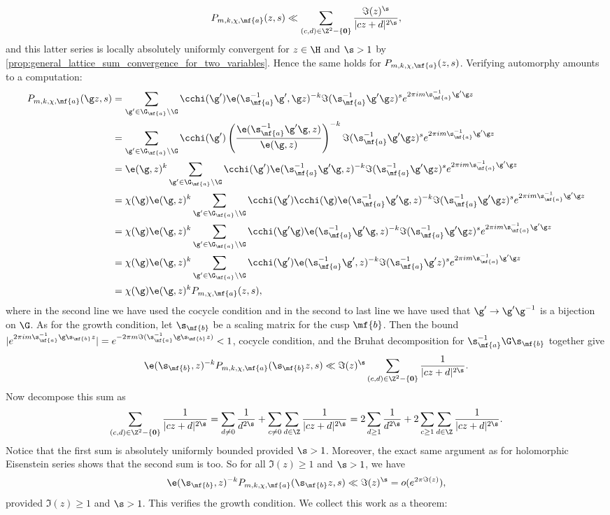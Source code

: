    \[
      P_{m,k,\chi,\mf{a}}(z,s) \ll \sum_{(c,d) \in \Z^{2}-\{\mathbf{0}\}}\frac{\Im(z)^{\s}}{|cz+d|^{2\s}},
    \]
    and this latter series is locally absolutely uniformly convergent for $z \in \H$ and $\s > 1$ by \cref{prop:general_lattice_sum_convergence_for_two_variables}. Hence the same holds for $P_{m,k,\chi,\mf{a}}(z,s)$. Verifying automorphy amounts to a computation:
    \begin{align*}
      P_{m,k,\chi,\mf{a}}(\g z,s) &= \sum_{\g' \in \G_{\mf{a}}\backslash\G}\cchi(\g')\e(\s_{\mf{a}}^{-1}\g',\g z)^{-k}\Im(\s_{\mf{a}}^{-1}\g'\g z)^{s}e^{2\pi im\s_{\mf{a}}^{-1}\g'\g z} \\
      &= \sum_{\g' \in \G_{\mf{a}}\backslash\G}\cchi(\g')\left(\frac{\e(\s_{\mf{a}}^{-1}\g'\g,z)}{\e(\g,z)}\right)^{-k}\Im(\s_{\mf{a}}^{-1}\g'\g z)^{s}e^{2\pi im\s_{\mf{a}}^{-1}\g'\g z} \\
      &= \e(\g,z)^{k}\sum_{\g' \in \G_{\mf{a}}\backslash\G}\cchi(\g')\e(\s_{\mf{a}}^{-1}\g'\g,z)^{-k}\Im(\s_{\mf{a}}^{-1}\g'\g z)^{s}e^{2\pi im\s_{\mf{a}}^{-1}\g'\g z} \\
      &= \chi(\g)\e(\g,z)^{k}\sum_{\g' \in \G_{\mf{a}}\backslash\G}\cchi(\g')\cchi(\g)\e(\s_{\mf{a}}^{-1}\g'\g,z)^{-k}\Im(\s_{\mf{a}}^{-1}\g'\g z)^{s}e^{2\pi im\s_{\mf{a}}^{-1}\g'\g z} \\
      &= \chi(\g)\e(\g,z)^{k}\sum_{\g' \in \G_{\mf{a}}\backslash\G}\cchi(\g'\g)\e(\s_{\mf{a}}^{-1}\g'\g,z)^{-k}\Im(\s_{\mf{a}}^{-1}\g'\g z)^{s}e^{2\pi im\s_{\mf{a}}^{-1}\g'\g z} \\
      &= \chi(\g)\e(\g,z)^{k}\sum_{\g' \in \G_{\mf{a}}\backslash\G}\cchi(\g')\e(\s_{\mf{a}}^{-1}\g',z)^{-k}\Im(\s_{\mf{a}}^{-1}\g' z)^{s}e^{2\pi im\s_{\mf{a}}^{-1}\g'\g z} \\
      &= \chi(\g)\e(\g,z)^{k}P_{m,\chi,\mf{a}}(z,s),
    \end{align*}
    where in the second line we have used the cocycle condition and in the second to last line we have used that $\g' \to \g'\g^{-1}$ is a bijection on $\G$. As for the growth condition, let $\s_{\mf{b}}$ be a scaling matrix for the cusp $\mf{b}$. Then the bound $|e^{2\pi im\s_{\mf{a}}^{-1}\g\s_{\mf{b}}z}| = e^{-2\pi m\Im(\s_{\mf{a}}^{-1}\g\s_{\mf{b}}z)} < 1$, cocycle condition, and the Bruhat decomposition for $\s_{\mf{a}}^{-1}\G\s_{\mf{b}}$ together give
    \[
      \e(\s_{\mf{b}},z)^{-k}P_{m,k,\chi,\mf{a}}(\s_{\mf{b}}z,s) \ll \Im(z)^{\s}\sum_{(c,d) \in \Z^{2}-\{\mathbf{0}\}}\frac{1}{|cz+d|^{2\s}}.
    \]
    Now decompose this sum as
    \[
      \sum_{(c,d) \in \Z^{2}-\{\mathbf{0}\}}\frac{1}{|cz+d|^{2\s}} = \sum_{d \neq 0}\frac{1}{d^{2\s}}+\sum_{c \neq 0}\sum_{d \in \Z}\frac{1}{|cz+d|^{2\s}} = 2\sum_{d \ge 1}\frac{1}{d^{2\s}}+2\sum_{c \ge 1}\sum_{d \in \Z}\frac{1}{|cz+d|^{2\s}}.
    \]
    Notice that the first sum is absolutely uniformly bounded provided $\s > 1$. Moreover, the exact same argument as for holomorphic Eisenstein series shows that the second sum is too. So for all $\Im(z) \ge 1$ and $\s > 1$, we have
    \[
      \e(\s_{\mf{b}},z)^{-k}P_{m,k,\chi,\mf{a}}(\s_{\mf{b}}z,s) \ll \Im(z)^{\s} = o(e^{2\pi\Im(z)}),
    \]
    provided $\Im(z) \ge 1$ and $\s > 1$. This verifies the growth condition. We collect this work as a theorem:

